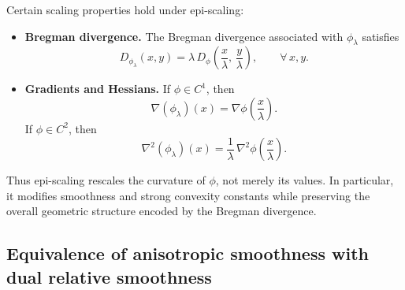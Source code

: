 \documentclass{article}
\theoremstyle{plain}
\theoremstyle{definition}
\newtheorem{definition}[theorem]{Definition}
\theoremstyle{remark}
\begin{document}
Certain scaling properties hold under epi-scaling:
\begin{itemize}
\item \noindent\textbf{Bregman divergence.}
The Bregman divergence associated with $\phi_{\lambda}$ satisfies
\[
D_{\phi_{\lambda}}(x,y)
=
\lambda\,D_\phi\!\left(\frac{x}{\lambda},\,\frac{y}{\lambda}\right),
\qquad \forall\,x,y.
\]

\item \noindent\textbf{Gradients and Hessians.}
If $\phi\in C^1$, then
\[
\nabla(\phi_{\lambda})(x)
=
\nabla\phi\!\left(\frac{x}{\lambda}\right).
\]
If $\phi\in C^2$, then
\[
\nabla^2(\phi_{\lambda})(x)
=
\frac{1}{\lambda}\,\nabla^2\phi\!\left(\frac{x}{\lambda}\right).
\]
\end{itemize}

Thus epi-scaling rescales the curvature of $\phi$, not merely its values. In
particular, it modifies smoothness and strong convexity constants while
preserving the overall geometric structure encoded by the Bregman divergence.

\subsection{Equivalence of anisotropic smoothness with dual relative smoothness}

\end{document}
